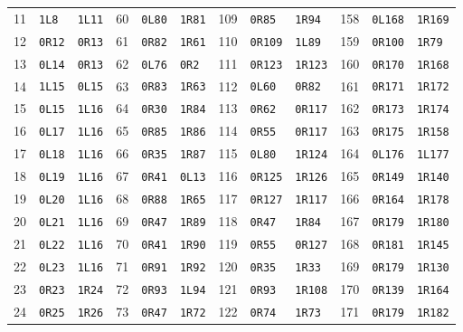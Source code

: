\begin{center}
\begin{tabular}{@{}rll@{\hspace{1.6em}}rll@{\hspace{1.6em}}rll@{\hspace{1.6em}}rll@{}}
11 & \texttt{1L8} & \texttt{1L11} & 60 & \texttt{0L80} & \texttt{1R81} & 109 & \texttt{0R85} & \texttt{1R94} & 158 & \texttt{0L168} & \texttt{1R169}\\
12 & \texttt{0R12} & \texttt{0R13} & 61 & \texttt{0R82} & \texttt{1R61} & 110 & \texttt{0R109} & \texttt{1L89} & 159 & \texttt{0R100} & \texttt{1R79}\\
13 & \texttt{0L14} & \texttt{0R13} & 62 & \texttt{0L76} & \texttt{0R2} & 111 & \texttt{0R123} & \texttt{1R123} & 160 & \texttt{0R170} & \texttt{1R168}\\
14 & \texttt{1L15} & \texttt{0L15} & 63 & \texttt{0R83} & \texttt{1R63} & 112 & \texttt{0L60} & \texttt{0R82} & 161 & \texttt{0R171} & \texttt{1R172}\\
15 & \texttt{0L15} & \texttt{1L16} & 64 & \texttt{0R30} & \texttt{1R84} & 113 & \texttt{0R62} & \texttt{0R117} & 162 & \texttt{0R173} & \texttt{1R174}\\
16 & \texttt{0L17} & \texttt{1L16} & 65 & \texttt{0R85} & \texttt{1R86} & 114 & \texttt{0R55} & \texttt{0R117} & 163 & \texttt{0R175} & \texttt{1R158}\\
17 & \texttt{0L18} & \texttt{1L16} & 66 & \texttt{0R35} & \texttt{1R87} & 115 & \texttt{0L80} & \texttt{1R124} & 164 & \texttt{0L176} & \texttt{1L177}\\
18 & \texttt{0L19} & \texttt{1L16} & 67 & \texttt{0R41} & \texttt{0L13} & 116 & \texttt{0R125} & \texttt{1R126} & 165 & \texttt{0R149} & \texttt{1R140}\\
19 & \texttt{0L20} & \texttt{1L16} & 68 & \texttt{0R88} & \texttt{1R65} & 117 & \texttt{0R127} & \texttt{1R117} & 166 & \texttt{0R164} & \texttt{1R178}\\
20 & \texttt{0L21} & \texttt{1L16} & 69 & \texttt{0R47} & \texttt{1R89} & 118 & \texttt{0R47} & \texttt{1R84} & 167 & \texttt{0R179} & \texttt{1R180}\\
21 & \texttt{0L22} & \texttt{1L16} & 70 & \texttt{0R41} & \texttt{1R90} & 119 & \texttt{0R55} & \texttt{0R127} & 168 & \texttt{0R181} & \texttt{1R145}\\
22 & \texttt{0L23} & \texttt{1L16} & 71 & \texttt{0R91} & \texttt{1R92} & 120 & \texttt{0R35} & \texttt{1R33} & 169 & \texttt{0R179} & \texttt{1R130}\\
23 & \texttt{0R23} & \texttt{1R24} & 72 & \texttt{0R93} & \texttt{1L94} & 121 & \texttt{0R93} & \texttt{1R108} & 170 & \texttt{0R139} & \texttt{1R164}\\
24 & \texttt{0R25} & \texttt{1R26} & 73 & \texttt{0R47} & \texttt{1R72} & 122 & \texttt{0R74} & \texttt{1R73} & 171 & \texttt{0R179} & \texttt{1R182}\\

\end{tabular}
\end{center}
